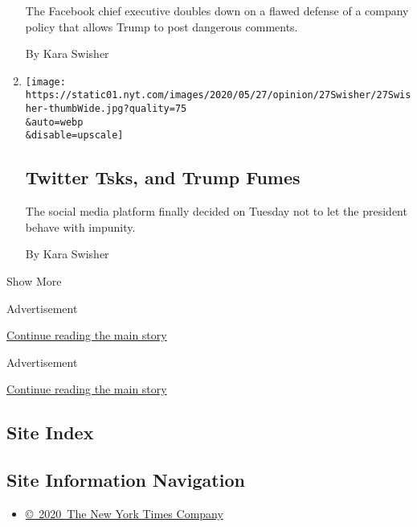 \begin{enumerate}
  The Facebook chief executive doubles down on a flawed defense of a
  company policy that allows Trump to post dangerous comments.

  By Kara Swisher
\item
  \href{/2020/05/27/opinion/twitter-trump-fact-checking.html}{}

  \texttt{[image: https://static01.nyt.com/images/2020/05/27/opinion/27Swisher/27Swisher-thumbWide.jpg?quality=75\\\&auto=webp\\\&disable=upscale]}

  \hypertarget{twitter-tsks-and-trump-fumes}{%
  \subsection{Twitter Tsks, and Trump
  Fumes}\label{twitter-tsks-and-trump-fumes}}

  The social media platform finally decided on Tuesday not to let the
  president behave with impunity.

  By Kara Swisher
\end{enumerate}

Show More

Advertisement

\protect\hyperlink{after-mid1}{Continue reading the main story}

Advertisement

\protect\hyperlink{after-mktg}{Continue reading the main story}

\hypertarget{site-index}{%
\subsection{Site Index}\label{site-index}}

\hypertarget{site-information-navigation}{%
\subsection{Site Information
Navigation}\label{site-information-navigation}}

\begin{itemize}
\tightlist
\item
  \href{https://help.nytimes.com/hc/en-us/articles/115014792127-Copyright-notice}{©~2020~The
  New York Times Company}
\end{itemize}

